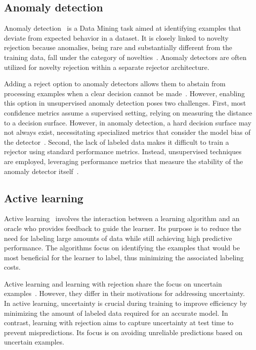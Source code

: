            
            
\subsection{Anomaly detection}

Anomaly detection~\citep{Prasad2009} is a Data Mining task aimed at identifying examples that deviate from expected behavior in a dataset. It is closely linked to novelty rejection because anomalies, being rare and substantially different from the training data, fall under the category of novelties~\citep{Ulmer2020,Pimentel2014,Markou2003}. Anomaly detectors are often utilized for novelty rejection within a separate rejector architecture.

Adding a reject option to anomaly detectors allows them to abstain from processing examples when a clear decision cannot be made~\citep{Perini2020,Perini2023}. However, enabling this option in unsupervised anomaly detection poses two challenges. First, most confidence metrics assume a supervised setting, relying on measuring the distance to a decision surface. However, in anomaly detection, a hard decision surface may not always exist, necessitating specialized metrics that consider the model bias of the detector~\citep{Perini2020}. Second, the lack of labeled data makes it difficult to train a rejector using standard performance metrics. Instead, unsupervised techniques are employed, leveraging performance metrics that measure the stability of the anomaly detector itself~\citep{Perini2020a}.


\subsection{Active learning}

Active learning~\citep{Settles2009b,Fu2013,Zhang2014,Nguyen2019b} involves the interaction between a learning algorithm and an oracle who provides feedback to guide the learner. Its purpose is to reduce the need for labeling large amounts of data while still achieving high predictive performance. The algorithms focus on identifying the examples that would be most beneficial for the learner to label, thus minimizing the associated labeling costs.

Active learning and learning with rejection share the focus on uncertain examples~\citep{Amin2021}. However, they differ in their motivations for addressing uncertainty. In active learning, uncertainty is crucial during training to improve efficiency by minimizing the amount of labeled data required for an accurate model. In contrast, learning with rejection aims to capture uncertainty at test time to prevent mispredictions. Its focus is on avoiding unreliable predictions based on uncertain examples. 

